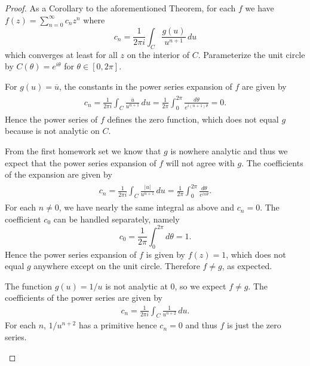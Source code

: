 \documentclass[10pt]{amsart}
\begin{document}
\begin{thm}
  \begin{proof}
    As a Corollary to the aforementioned Theorem, for each $f$ we have $f(z) = \sum_{n=0}^{\infty} c_nz^n$ where $$c_n = \frac{1}{2\pi i} \int_C \frac{g(u)}{u^{n+1}}\,du$$ which converges at least for all $z$ on the interior of $C$.
    Parameterize the unit circle by $C(\theta) = e^{i\theta}$ for $\theta \in [0,2\pi]$.
    \begin{alphaenum}
    \item
      For $g(u) = \overline{u}$, the constants in the power series expansion of $f$ are given by
      \begin{align*}
        \begin{split}
          c_n = \frac{1}{2\pi i}\int_C \frac{\overline{u}}{u^{n+1}}\,du = \frac{1}{2\pi}\int_0^{2\pi} \frac{d\theta}{e^{i(n+1)\theta}} = 0.
        \end{split}
      \end{align*}
      Hence the power series of $f$ defines the zero function, which does not equal $g$ because is not analytic on $C$.
    \item
      From the first homework set we know that $g$ is nowhere analytic and thus we expect that the power series expansion of $f$ will not agree with $g$.
      The coefficients of the expansion are given by
      \begin{align*}
        \begin{split}
          c_n = \frac{1}{2\pi i}\int_C \frac{|u|}{u^{n+1}}\,du = \frac{1}{2\pi}\int_0^{2\pi} \frac{d\theta}{e^{in\theta}}.
        \end{split}
      \end{align*}
      For each $n \not = 0$, we have nearly the same integral as above and $c_n = 0$.
      The coefficient $c_0$ can be handled separately, namely
      $$c_0 = \frac{1}{2\pi}\int_0^{2\pi}d\theta = 1.$$
      Hence the power series expansion of $f$ is given by $f(z) = 1$, which does not equal $g$ anywhere except on the unit circle.
      Therefore $f \not = g$, as expected.
    \item
      The function $g(u) = 1/u$ is not analytic at 0, so we expect $f \not = g$.
      The coefficients of the power series are given by
      \begin{align*}
        c_n = \frac{1}{2\pi i}\int_C \frac{1}{u^{n+2}}\,du.
      \end{align*}
      For each $n$, $1/u^{n+2}$ has a primitive hence $c_n = 0$ and thus $f$ is just the zero series.

\end{alphaenum}
\end{proof}
\end{thm}
\end{document}
